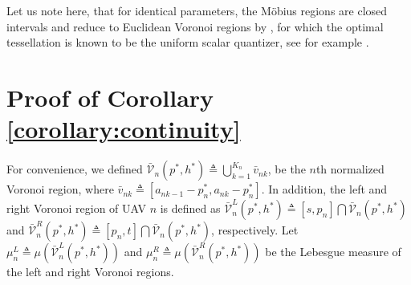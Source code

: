 \documentclass[12pt,onecolumn,journal,draftclsnofoot,letterpaper]{IEEEtran}
\newcounter{example}[section]
\newcommand{\Vor}{\ensuremath{\mathcal{V}}}         %
\newcommand{\junstart}{\color{black}}
\begin{document}
  Let us note here, that for identical parameters, the Möbius regions are closed intervals and reduce to Euclidean
  Voronoi regions by ,
  for which the optimal tessellation is known to be the uniform scalar quantizer, see for example \cite{GN98}. 
\fi










\junstart \section{Proof of Corollary \ref{corollary:continuity}}\label{proof:continuity} 

For convenience, we defined $\bar{\Vor}_n(p^*,
h^*)\triangleq\bigcup_{k=1}^{K_n}\bar{v}_{nk}$, be the $n$th normalized Voronoi region, where
$\bar{v}_{nk}\triangleq[a_{nk-1}-p^*_n,a_{nk}-p^*_n]$.
In addition, the left and right Voronoi region of UAV $n$ is defined as $\bar{\Vor}^{L}_{n}(p^*, h^*) \triangleq
[s,p_n]\bigcap\bar{\Vor}_{n}(p^*, h^*)$ and $\bar{\Vor}^{R}_{n}(p^*, h^*) \triangleq [p_n, t]\bigcap\bar{\Vor}_{n}(p^*,
h^*)$, respectively.  Let $\mu^L_n\triangleq\mu\left(\bar{\Vor}^{L}_{n}(p^*, h^*)\right)$ and
$\mu^R_n\triangleq\mu\left(\bar{\Vor}^{R}_{n}(p^*, h^*)\right)$ be the Lebesgue measure of the left and right Voronoi
regions.
\end{document}
